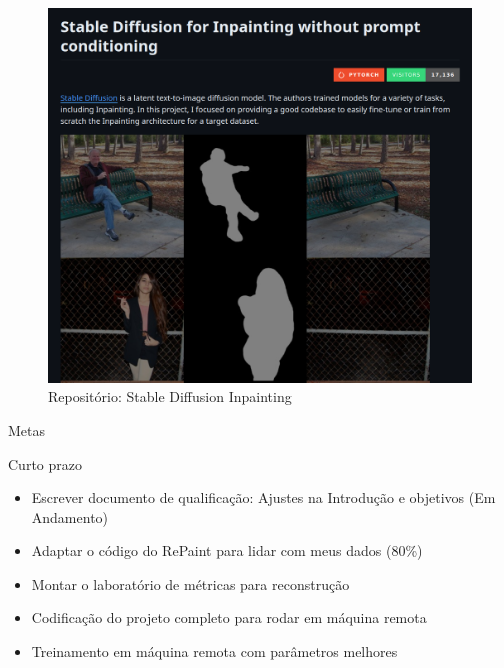 \documentclass[aspectratio=169]{beamer}
\begin{document}
\begin{frame}

    \begin{figure}
        \centering
        \includegraphics[width=\textwidth]{figs/inpaintingrepo.png}
        \caption{Repositório: Stable Diffusion Inpainting}
    \end{figure}   
\end{frame}


\begin{frame}{Metas}
    \begin{block}{Curto prazo}

\begin{itemize}
    \item Escrever documento de qualificação: Ajustes na Introdução e objetivos (Em Andamento)
    \item Adaptar o código do RePaint para lidar com meus dados (80\%)
    \item Montar o laboratório de métricas para reconstrução 
    \item Codificação do projeto completo para rodar em máquina remota
    \item Treinamento em máquina remota com parâmetros melhores
\end{itemize}


\end{block}



\end{frame}
\end{document}
